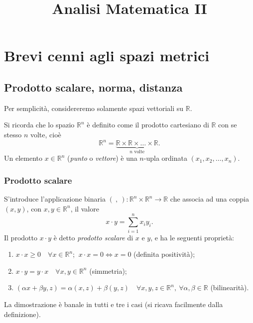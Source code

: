 \documentclass[a4paper]{book}
\numberwithin{equation}{section}
\theoremstyle{plain}
\theoremstyle{definition}
\theoremstyle{remark}
\theoremstyle{example}
\begin{document}
\title{Analisi Matematica II}

\author{}
\date{}

\maketitle

\tableofcontents

\chapter{Brevi cenni agli spazi metrici}

\section{Prodotto scalare, norma, distanza}
Per semplicità, considereremo solamente spazi vettoriali su $\mathbb{R}$.

Si ricorda che lo spazio $\mathbb{R}^n$ è definito come il prodotto cartesiano di $\mathbb{R}$ con se stesso $n$ volte, cioè
\begin{equation}
	\mathbb{R}^n = \underbrace{\mathbb{R}\times \mathbb{R} \times \dots \times \mathbb{R}}_{n \text{ volte}}.
\end{equation}
Un elemento $x \in \mathbb{R}^n$ (\emph{punto} o \emph{vettore}) è una $n$-upla ordinata $(x_1, x_2, \dots, x_n)$.

\subsection{Prodotto scalare}
S'introduce l'applicazione binaria $(\ ,\ )\colon\mathbb{R}^n\times\mathbb{R}^n \to \mathbb{R}$ che associa ad una coppia $(x,y)$, con $x,y\in\mathbb{R}^n$, il valore
\begin{equation}
	\label{eqn:prodscal}
	x\cdot y = \sum_{i=1}^nx_iy_i.
\end{equation}
Il prodotto $x\cdot y$ è detto \emph{prodotto scalare} di $x$ e $y$, e ha le seguenti proprietà:
\begin{enumerate}[label=$\mathcal{S}$\arabic*.]
	\item \label{s1} $x\cdot x \ge 0 \quad \forall x\in \mathbb{R}^n$; $\ x\cdot x = 0 \iff x = 0$ (definita positività);
	\item \label{s2} $x\cdot y = y \cdot x \quad \forall x, y \in \mathbb{R}^n$ (simmetria);
	\item \label{s3} $(\alpha x + \beta y, z) = \alpha(x, z) + \beta(y, z) \quad \forall x,y,z \in \mathbb{R}^n,\ \forall \alpha, \beta \in \mathbb{R}$ (bilinearità).
\end{enumerate}
\proof La dimostrazione è banale in tutti e tre i casi (si ricava facilmente dalla definizione).
\endproof
\end{document}
